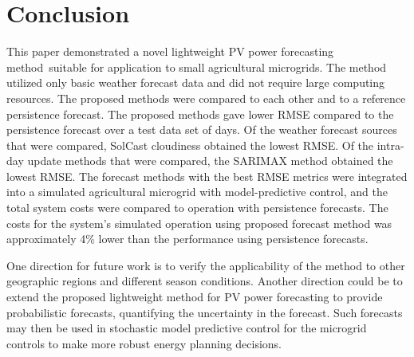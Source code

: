 \section{Conclusion}
\label{sec:conclusion}

This paper demonstrated a novel lightweight PV power forecasting method\ suitable for application to small agricultural microgrids.
The method utilized only basic weather forecast data and did not require large computing resources.
The proposed methods were compared to each other and to a reference persistence forecast.
The proposed methods gave lower RMSE compared to the persistence forecast
over a test data set of
 days.
Of the weather forecast sources that were compared,
SolCast cloudiness
obtained the lowest RMSE.
Of the intra-day update methods that were compared,
the SARIMAX method
obtained the lowest RMSE.
The forecast methods with the best RMSE metrics were integrated into a simulated
agricultural microgrid with model-predictive control,
and the total system costs were compared to operation with persistence forecasts.
The costs for the system's simulated operation using proposed forecast method was approximately
4\% lower than the performance using persistence forecasts.

One direction for future work is to verify the applicability of the method to other geographic regions and different season conditions.
Another direction could be to extend the proposed lightweight method for PV power forecasting to provide probabilistic forecasts, quantifying the uncertainty in the forecast.
Such forecasts may then be used in stochastic model predictive control for the microgrid controls to make more robust energy planning decisions.
